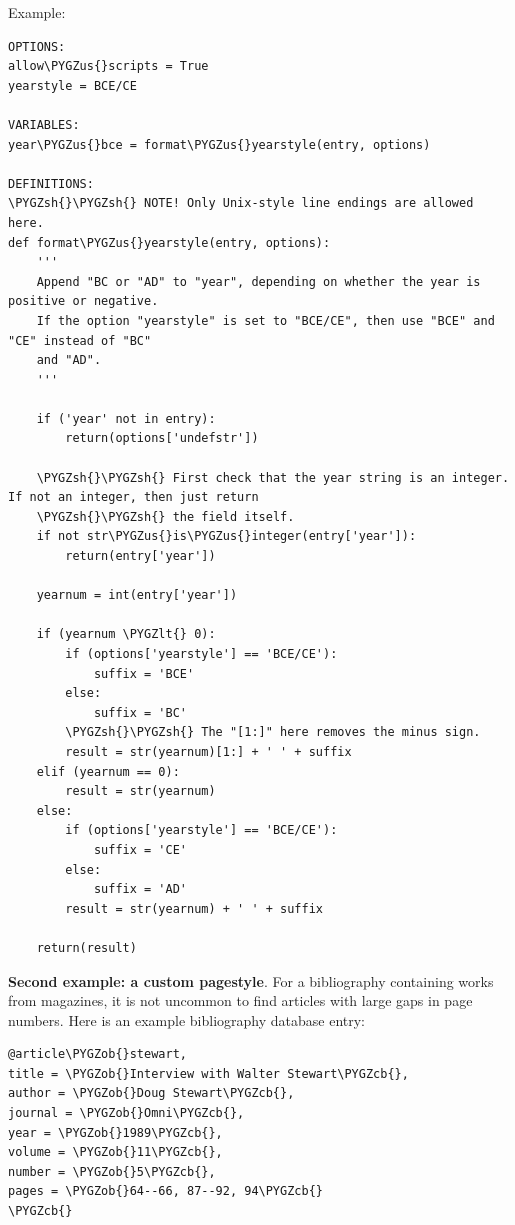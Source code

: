 \documentclass[letterpaper,10pt,english]{sphinxmanual}
\def\PYGZus{\char`\_}
\def\PYGZob{\char`\{}
\def\PYGZcb{\char`\}}
\def\PYGZlt{\char`\<}
\def\PYGZsh{\char`\#}
\begin{document}
Example:

\begin{Verbatim}[commandchars=\\\{\}]
OPTIONS:
allow\PYGZus{}scripts = True
yearstyle = BCE/CE

VARIABLES:
year\PYGZus{}bce = format\PYGZus{}yearstyle(entry, options)

DEFINITIONS:
\PYGZsh{}\PYGZsh{} NOTE! Only Unix-style line endings are allowed here.
def format\PYGZus{}yearstyle(entry, options):
    '''
    Append "BC or "AD" to "year", depending on whether the year is positive or negative.
    If the option "yearstyle" is set to "BCE/CE", then use "BCE" and "CE" instead of "BC"
    and "AD".
    '''

    if ('year' not in entry):
        return(options['undefstr'])

    \PYGZsh{}\PYGZsh{} First check that the year string is an integer. If not an integer, then just return
    \PYGZsh{}\PYGZsh{} the field itself.
    if not str\PYGZus{}is\PYGZus{}integer(entry['year']):
        return(entry['year'])

    yearnum = int(entry['year'])

    if (yearnum \PYGZlt{} 0):
        if (options['yearstyle'] == 'BCE/CE'):
            suffix = 'BCE'
        else:
            suffix = 'BC'
        \PYGZsh{}\PYGZsh{} The "[1:]" here removes the minus sign.
        result = str(yearnum)[1:] + ' ' + suffix
    elif (yearnum == 0):
        result = str(yearnum)
    else:
        if (options['yearstyle'] == 'BCE/CE'):
            suffix = 'CE'
        else:
            suffix = 'AD'
        result = str(yearnum) + ' ' + suffix

    return(result)
\end{Verbatim}

\textbf{Second example: a custom pagestyle}. For a bibliography containing works from magazines, it is not uncommon to find articles with large gaps in page numbers. Here is an example bibliography database entry:

\begin{Verbatim}[commandchars=\\\{\}]
@article\PYGZob{}stewart,
title = \PYGZob{}Interview with Walter Stewart\PYGZcb{},
author = \PYGZob{}Doug Stewart\PYGZcb{},
journal = \PYGZob{}Omni\PYGZcb{},
year = \PYGZob{}1989\PYGZcb{},
volume = \PYGZob{}11\PYGZcb{},
number = \PYGZob{}5\PYGZcb{},
pages = \PYGZob{}64--66, 87--92, 94\PYGZcb{}
\PYGZcb{}
\end{Verbatim}
\end{document}
